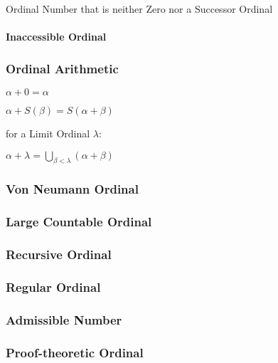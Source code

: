 Ordinal Number that is neither Zero nor a Successor Ordinal



\paragraph{Inaccessible Ordinal}\label{sec:inaccessible_ordinal}\hfill



\subsubsection{Ordinal Arithmetic}\label{sec:ordinal_arithmetic}

$\alpha + 0 = \alpha$

$\alpha + S(\beta) = S(\alpha + \beta)$

for a Limit Ordinal $\lambda$:

$\alpha + \lambda = \bigcup_{\beta < \lambda} (\alpha + \beta)$



\subsubsection{Von Neumann Ordinal}\label{sec:vonneumann_ordinal}

\subsubsection{Large Countable Ordinal}\label{sec:large_countable}

\subsubsection{Recursive Ordinal}\label{sec:recursive_ordinal}

\subsubsection{Regular Ordinal}\label{sec:regular_ordinal}

\subsubsection{Admissible Number}\label{sec:admissible_ordinal}

\subsubsection{Proof-theoretic Ordinal}\label{sec:proof_ordinal}

